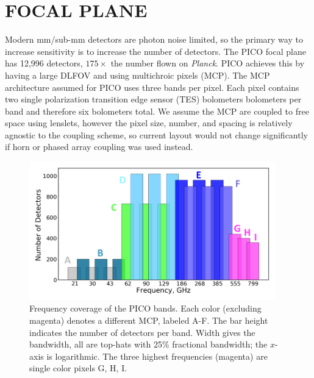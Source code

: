 \documentclass[]{spie}  %
\begin{document}
%
%

\section{FOCAL PLANE}
\label{sec:focalplane}

Modern mm/sub-mm detectors are photon noise limited, so the primary way to increase sensitivity is to increase the number of detectors. 
The PICO focal plane has 12,996 detectors, $175\times$ the number flown on \textit{Planck}. PICO achieves this by having a large DLFOV and using 
multichroic pixels (MCP)\cite{Suzuki2014_samps}.  
The MCP architecture assumed for PICO uses three bands per pixel. Each 
pixel contains two single polarization transition edge sensor (TES) bolometers bolometers per band and therefore six bolometers total. 
We assume the MCP are coupled to free space using lenslets\cite{Suzuki2014_samps}, however the pixel size, number, and spacing is 
relatively agnostic to the coupling scheme, so current layout would not change significantly if horn or phased array coupling was used 
instead.


\begin{figure} [ht]
\begin{center}
\includegraphics[height=6cm]{bands_label.png}
\end{center}
\caption { \label{fig:bands} 
Frequency coverage of the PICO bands. Each color (excluding magenta) denotes a different MCP, labeled A-F. The bar height 
indicates the number of detectors per band.  Width gives the bandwidth, all are top-hats with 
25\% fractional bandwidth; the $x$-axis is logarithmic.  The three highest frequencies (magenta) are single color pixels G, H, I.
}
\end{figure} 
\end{document}
